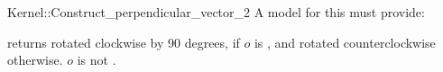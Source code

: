 \begin{ccRefFunctionObjectConcept}{Kernel::Construct_perpendicular_vector_2}
A model for this must provide:


{returns  rotated clockwise by 90 degrees, if $o$ is
, and rotated counterclockwise otherwise.
\ccPrecond $o$ is not .
}

\end{ccRefFunctionObjectConcept}
